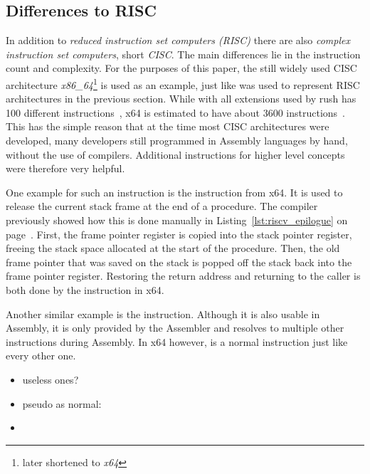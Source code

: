 \subsection{Differences to RISC}

In addition to \emph{reduced instruction set computers (RISC)} there are also \emph{complex instruction set computers}, short \emph{CISC}.
The main differences lie in the instruction count and complexity.
For the purposes of this paper, the still widely used CISC architecture \emph{x86\_64}\footnote{later shortened to \emph{x64}} is used as an example, just like \riscv{} was used to represent RISC architectures in the previous section.
While \riscv{} with all extensions used by rush has 100 different instructions~\cite[Chapter~24]{Waterman2019}, x64 is estimated to have about 3600 instructions~\cite{Rodgers2017}.
This has the simple reason that at the time most CISC architectures were developed, many developers still programmed in Assembly languages by hand, without the use of compilers.
Additional instructions for higher level concepts were therefore very helpful.

One example for such an instruction is the  instruction from x64.
It is used to release the current stack frame at the end of a procedure.
The \riscv{} compiler previously showed how this is done manually in Listing~\ref{lst:riscv_epilogue} on page~\pageref{lst:riscv_epilogue}.
First, the frame pointer register is copied into the stack pointer register, freeing the stack space allocated at the start of the procedure.
Then, the old frame pointer that was saved on the stack is popped off the stack back into the frame pointer register.
Restoring the return address and returning to the caller is both done by the  instruction in x64.

Another similar example is the  instruction.
Although it is also usable in \riscv{} Assembly, it is only provided by the Assembler and resolves to multiple other \riscv{} instructions during Assembly.
In x64 however,  is a normal instruction just like every other one.

\begin{itemize}
    \item useless ones?
    \item pseudo as normal: 
    \item {}
\end{itemize}

